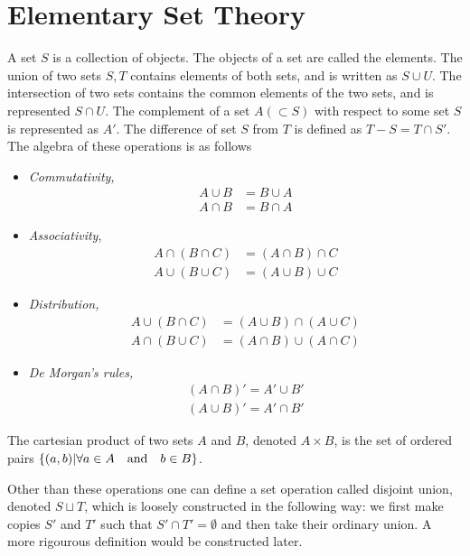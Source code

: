\section{Elementary Set Theory}
A set $S$ is a collection of objects. The objects of a set are called the elements. The union of two sets $S,T$ contains elements of both sets, and is written as $S\cup U$. The intersection of two sets contains the common elements of the two sets, and is represented $S\cap U$. The complement of a set $A(\subset S)$ with respect to some set $S$ is represented as $A'$. The difference  of set $S$ from $T$ is defined as $T-S=T\cap S'$. The algebra of these operations is as follows
\begin{itemize}
  \item \textit{Commutativity,}
    \begin{align*}
        A \cup B &= B\cup A\\
        A \cap B &= B\cap A
    \end{align*}
  \item \textit{Associativity},
    \begin{align*}
      A \cap \left( B \cap C\right) &= \left( A \cap B \right) \cap C\\
      A \cup \left( B \cup C\right) &= \left( A \cup B \right) \cup C
    \end{align*}
  \item \textit{Distribution,}
    \begin{align*}
      A \cup \left( B \cap C \right) &= \left( A \cup B \right) \cap \left( A \cup C \right)\\
      A \cap \left( B \cup C \right) &= \left( A \cap B \right) \cup \left( A \cap C \right)
    \end{align*}
  \item \textit{De Morgan's rules,}
    \begin{align*}
      (A\cap B)' = A'\cup B'\\
      (A\cup B)' = A'\cap B'
    \end{align*}
\end{itemize}
\begin{definition}
  The cartesian product of two sets $A$ and $B$, denoted $A\times B$, is the set of ordered pairs $\{(a,b)|\forall a\in A \qq{and} b\in B\}$.
\end{definition}
Other than these operations one can define a set operation called disjoint union, denoted $S\sqcup T$, which is loosely constructed in the following way: we first make copies $S'$ and $T'$ such that $S'\cap T' = \emptyset$ and then take their ordinary union. A more rigourous definition would be constructed later.
